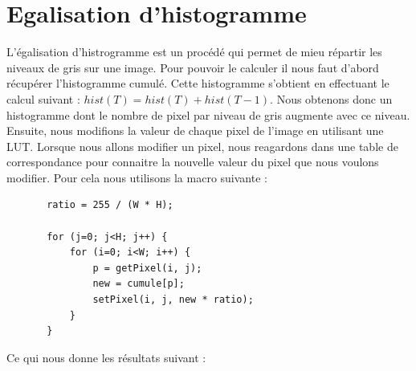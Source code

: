 \documentclass[a4paper,11pt]{article}
\begin{document}
  
  \section{Egalisation d'histogramme}
  L'égalisation d'histrogramme est un procédé qui permet de mieu répartir les niveaux de gris sur une image.
  Pour pouvoir le calculer il nous faut d'abord récupérer l'histogramme cumulé. 
  Cette histogramme s'obtient en effectuant le calcul suivant : $hist(T)=hist(T)+hist(T-1)$. Nous obtenons donc
  un histogramme dont le nombre de pixel par niveau de gris augmente avec ce niveau. Ensuite, nous modifions la valeur de chaque pixel
  de l'image en utilisant une LUT. Lorsque nous allons modifier un pixel, nous reagardons dans une table de correspondance pour 
  connaitre la nouvelle valeur du pixel que nous voulons modifier. Pour cela nous utilisons la macro suivante :
  
  \begin{lstlisting}
       ratio = 255 / (W * H);

       for (j=0; j<H; j++) {
           for (i=0; i<W; i++) {
               p = getPixel(i, j);
               new = cumule[p];
               setPixel(i, j, new * ratio);
           }
       }
  \end{lstlisting}

  Ce qui nous donne les résultats suivant : \\
  
\end{document}
